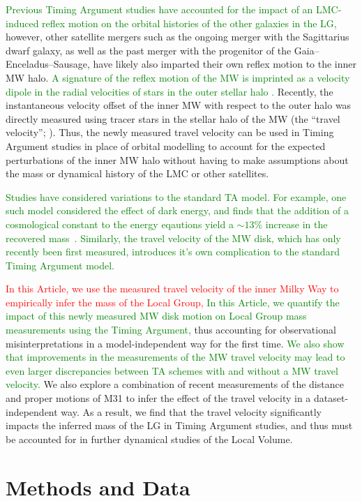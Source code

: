 \documentclass[twocolumn]{aastex631}
\newcommand{\remove}[1]{\textcolor{red}{#1}}
\newcommand{\add}[1]{\textcolor{green}{#1}}
\begin{document}
\add{Previous Timing Argument studies have accounted for the impact of
an LMC-induced reflex motion on the orbital histories of the other galaxies in
the LG,} however, other satellite mergers such as the ongoing merger with the
Sagittarius dwarf galaxy, as well as the past merger with the progenitor of the
Gaia--Enceladus--Sausage, have likely also imparted their own reflex motion to
the inner MW halo.
\add{A signature of the reflex motion of the MW is imprinted as a velocity
dipole in the radial velocities of stars in the outer stellar halo
\cite{Garavito-Camargo2021b}.}
Recently, the instantaneous velocity offset of the inner MW with respect
to the outer halo was directly measured using tracer stars in the stellar halo
of the MW (the ``travel velocity''; \citealt{Petersen2021}).
Thus, the newly measured travel velocity can be used in Timing Argument studies
in place of orbital modelling to account for the expected perturbations of the
inner MW halo without having to make assumptions about the mass or dynamical
history of the LMC or other satellites.

\add{Studies have considered variations to the standard TA model.
For example, one such model considered the effect of dark energy, and finds that
the addition of a cosmological constant to the energy eqautions yield a
$\sim13\%$ increase in the recovered mass~\citep{Partridge:2013}.
Similarly, the travel velocity of the MW disk, which has only recently been
first measured, introduces it's own complication to the standard Timing Argument
model.}

\remove{In this Article, we use the measured travel velocity of the inner Milky
Way to empirically infer the mass of the Local Group,}
\add{In this Article, we quantify the impact of this newly measured MW disk
motion on Local Group mass measurements using the Timing Argument,}
thus accounting for observational
misinterpretations in a model-independent way for the first time.
\add{We also show that improvements in the measurements of the MW travel
velocity may lead to even larger discrepancies between TA schemes with and
without a MW travel velocity.}
We also explore a combination of recent measurements of the distance and proper
motions of M31 to infer the effect of the travel velocity in a
dataset-independent way.
As a result, we find that the travel velocity significantly impacts the inferred
mass of the LG in Timing Argument studies, and thus must be accounted for in
further dynamical studies of the Local Volume.

\section{Methods and Data}
\end{document}
